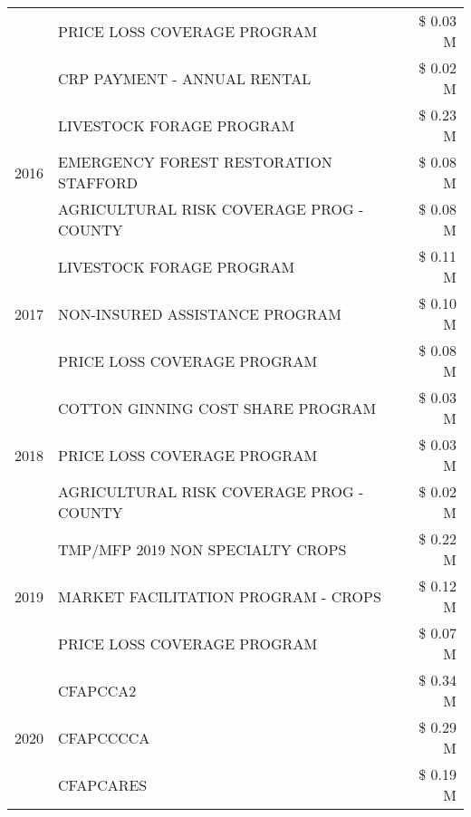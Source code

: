\begin{tabular}{llr}
 & PRICE LOSS COVERAGE PROGRAM & \$ 0.03 M \\
 & CRP PAYMENT - ANNUAL RENTAL & \$ 0.02 M \\
\cline{1-3}
\multirow[t]{3}{*}{2016} & LIVESTOCK FORAGE PROGRAM                      & \$ 0.23 M \\
 & EMERGENCY FOREST RESTORATION STAFFORD         & \$ 0.08 M \\
 & AGRICULTURAL RISK COVERAGE PROG - COUNTY      & \$ 0.08 M \\
\cline{1-3}
\multirow[t]{3}{*}{2017} & LIVESTOCK FORAGE PROGRAM & \$ 0.11 M \\
 & NON-INSURED ASSISTANCE PROGRAM & \$ 0.10 M \\
 & PRICE LOSS COVERAGE PROGRAM & \$ 0.08 M \\
\cline{1-3}
\multirow[t]{3}{*}{2018} & COTTON GINNING COST SHARE PROGRAM & \$ 0.03 M \\
 & PRICE LOSS COVERAGE PROGRAM & \$ 0.03 M \\
 & AGRICULTURAL RISK COVERAGE PROG - COUNTY & \$ 0.02 M \\
\cline{1-3}
\multirow[t]{3}{*}{2019} & TMP/MFP 2019 NON SPECIALTY CROPS & \$ 0.22 M \\
 & MARKET FACILITATION PROGRAM - CROPS & \$ 0.12 M \\
 & PRICE LOSS COVERAGE PROGRAM & \$ 0.07 M \\
\cline{1-3}
\multirow[t]{3}{*}{2020} & CFAPCCA2 & \$ 0.34 M \\
 & CFAPCCCCA & \$ 0.29 M \\
 & CFAPCARES & \$ 0.19 M \\
\cline{1-3}
\bottomrule
\end{tabular}
